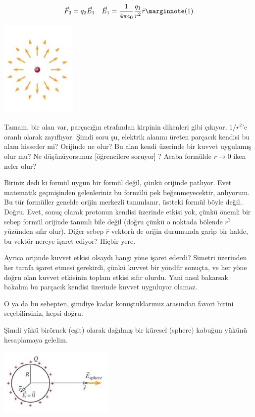 \documentclass[12pt,fleqn]{article}\usepackage{../../common}
\begin{document}
$$
\vec{F}_2 = q_2 \vec{E}_1 \quad
\vec{E}_1 = \frac{1}{4\pi \epsilon_0} \frac{q_1}{r^2} \hat{r} \mlabel{1}
$$

\includegraphics[width=10em]{02_05.png}

Tamam, bir alan var, parçacığın etrafından kirpinin dikenleri gibi çıkıyor,
$1/r^2$'e oranlı olarak zayıflıyor. Şimdi soru şu, elektrik alanını üreten
parçacık kendisi bu alanı hisseder mi? Orijinde ne olur?  Bu alan kendi üzerinde
bir kuvvet uygulamış olur mu? Ne düşünüyorsunuz [öğrencilere soruyor] ? Acaba
formülde $r \to 0$ iken neler olur?

Biriniz dedi ki formül uygun bir formül değil, çünkü orijinde patlıyor. Evet
matematik geçmişinden gelenleriniz bu formülü pek beğenmeyecektir, anlıyorum. Bu
tür formüller genelde orijin merkezli tanımlanır, üstteki formül böyle
değil.. Doğru. Evet, sonuç olarak protonun kendisi üzerinde etkisi yok, çünkü
önemli bir sebep formül orijinde tanımlı bile değil (doğru çünkü o noktada
bölende $r^2$ yüzünden sıfır olur). Diğer sebep $\hat{r}$ vektorü de orijin
durumunda garip bir halde, bu vektör nereye işaret ediyor?  Hiçbir yere.

Ayrıca orijinde kuvvet etkisi olsaydı hangi yöne işaret ederdi? Simetri
üzerinden her tarafa işaret etmesi gerekirdi, çünkü kuvvet bir yöndür sonuçta,
ve her yöne doğru olan kuvvet etkisinin toplam etkisi sıfır olurdu. Yani nasıl
bakarsak bakalım bu parçacık kendisi üzerinde kuvvet uyguluyor olamaz.

O ya da bu sebepten, şimdiye kadar konuştuklarımız arasından favori birini
seçebilirsiniz, hepsi doğru.

Şimdi yükü birörnek (eşit) olarak dağılmış bir küresel (sphere) kabuğun yükünü
hesaplamaya gelelim.

\includegraphics[width=15em]{02_06.png}
\end{document}

